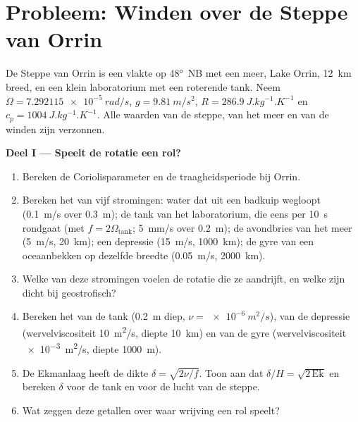 \section{Probleem: Winden over de Steppe van Orrin}

\begin{problem}
\label{pb:b3:gfd-foundations:1}
De Steppe van Orrin is een vlakte op \ang{48}~NB met een meer, Lake Orrin,
\qty{12}{km} breed, en een klein laboratorium met een roterende tank. Neem
$\Omega = \qty{7.292115e-5}{rad/s}$, $g = \qty{9.81}{m/s^2}$, $R =
\qty{286.9}{J.kg^{-1}.K^{-1}}$ en $c_p = \qty{1004}{J.kg^{-1}.K^{-1}}$.
Alle waarden van de steppe, van het meer en van de winden zijn verzonnen.

\medskip\noindent\textbf{Deel I --- Speelt de rotatie een rol?}
\begin{enumerate}
\item Bereken de Coriolisparameter en de traagheidsperiode bij Orrin.
\item Bereken het  van vijf stromingen: water dat uit een badkuip wegloopt
  (\qty{0.1}{m/s} over \qty{0.3}{m}); de tank van het laboratorium, die
  eens per \qty{10}{s} rondgaat (met $f = 2\Omega_{\text{tank}}$; \qty{5}{mm/s}
  over \qty{0.2}{m}); de avondbries van het meer (\qty{5}{m/s},
  \qty{20}{km}); een depressie (\qty{15}{m/s}, \qty{1000}{km}); de gyre van een
  oceaanbekken op dezelfde breedte (\qty{0.05}{m/s}, \qty{2000}{km}).
\item Welke van deze stromingen voelen de rotatie die ze aandrijft, en welke zijn
  dicht bij geostrofisch?
\item Bereken het  van de tank (\qty{0.2}{m} diep, $\nu =
  \qty{e-6}{m^2/s}$), van de depressie (wervelviscositeit \qty{10}{m^2/s},
  diepte \qty{10}{km}) en van de gyre (wervelviscositeit \qty{e-3}{m^2/s},
  diepte \qty{1000}{m}).
\item De Ekmanlaag heeft de dikte $\delta = \sqrt{2\nu/f}$. Toon aan dat
  $\delta/H = \sqrt{2\,\mathrm{Ek}}$ en bereken $\delta$ voor de tank en voor
  de lucht van de steppe.
\item Wat zeggen deze getallen over waar wrijving een rol speelt?
\end{enumerate}


\end{problem}
